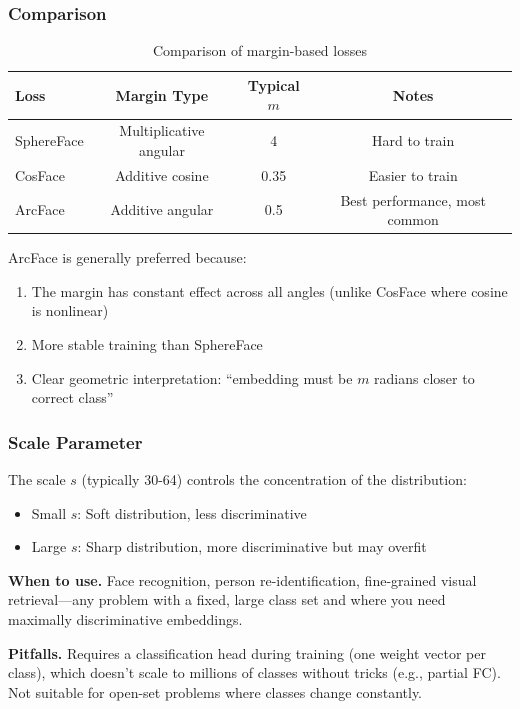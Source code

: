 \subsubsection{Comparison}

\begin{table}[H]
\centering
\caption{Comparison of margin-based losses}
\begin{tabular}{lccc}
\toprule
\textbf{Loss} & \textbf{Margin Type} & \textbf{Typical $m$} & \textbf{Notes} \\
\midrule
SphereFace & Multiplicative angular & 4 & Hard to train \\
CosFace & Additive cosine & 0.35 & Easier to train \\
ArcFace & Additive angular & 0.5 & Best performance, most common \\
\bottomrule
\end{tabular}
\end{table}

\begin{keyinsight}
ArcFace is generally preferred because:
\begin{enumerate}
    \item The margin has constant effect across all angles (unlike CosFace where cosine is nonlinear)
    \item More stable training than SphereFace
    \item Clear geometric interpretation: ``embedding must be $m$ radians closer to correct class''
\end{enumerate}
\end{keyinsight}

\subsubsection{Scale Parameter}

The scale $s$ (typically 30-64) controls the concentration of the distribution:
\begin{itemize}
    \item Small $s$: Soft distribution, less discriminative
    \item Large $s$: Sharp distribution, more discriminative but may overfit
\end{itemize}

\textbf{When to use.} Face recognition, person re-identification, fine-grained visual retrieval---any problem with a fixed, large class set and where you need maximally discriminative embeddings.

\textbf{Pitfalls.} Requires a classification head during training (one weight vector per class), which doesn't scale to millions of classes without tricks (e.g., partial FC). Not suitable for open-set problems where classes change constantly.

